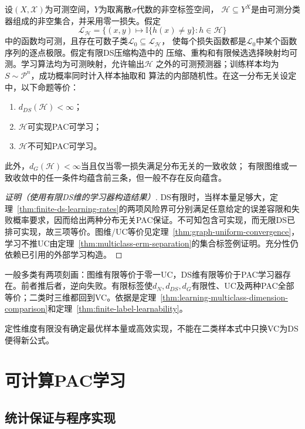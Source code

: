 \begin{theorem}[多分类学习基本定理]
\label{thm:ds-characterization}
设$(X,\mathcal X)$为可测空间，$Y$为取离散$\sigma$代数的非空标签空间，
$\mathcal H\subseteq Y^X$是由可测分类器组成的非空集合，并采用零一损失。假定
\[
 \mathcal L_{\mathcal H}
 =\{(x,y)\mapsto\mathbb I\{h(x)\neq y\}:h\in\mathcal H\}
\]
中的函数均可测，且存在可数子类$\mathcal L_0\subseteq\mathcal L_{\mathcal H}$，
使每个损失函数都是$\mathcal L_0$中某个函数序列的逐点极限。假定有限DS压缩构造中的
压缩、重构和有限候选选择映射均可测。学习算法均为可测映射，允许输出$\mathcal H$
之外的可测预测器；训练样本均为$S\sim\mathcal P^n$，成功概率同时计入样本抽取和
算法的内部随机性。在这一分布无关设定中，以下命题等价：
\begin{enumerate}
 \item $d_{DS}(\mathcal H)<\infty$；
 \item $\mathcal H$可实现PAC可学习；
 \item $\mathcal H$不可知PAC可学习。
\end{enumerate}
此外，$d_G(\mathcal H)<\infty$当且仅当零一损失满足分布无关的一致收敛；
有限图维或一致收敛中的任一条件均蕴含前三条，但一般不存在反向蕴含。
\end{theorem}

\begin{proof}[证明（使用有限DS维的学习器构造结果）]
DS有限时，当样本量足够大，定理~\ref{thm:finite-ds-learning-rates}的两项风险界可分别满足任意给定的误差容限和失败概率要求，因而给出两种分布无关PAC保证。不可知包含可实现，而无限DS已排可实现，故三项等价。图维/UC等价见定理~\ref{thm:graph-uniform-convergence}，学习不推UC由定理~\ref{thm:multiclass-erm-separation}的集合标签例证明。充分性仍依赖已引用的外部学习构造。
\end{proof}

一般多类有两项刻画：图维有限等价于零一UC，DS维有限等价于PAC学习器存在。前者推后者，逆向失败。有限标签使$d_N,d_{DS},d_G$有限性、UC及两种PAC全部等价；二类时三维都回到VC。依据是定理~\ref{thm:learning-multiclass-dimension-comparison}和定理~\ref{thm:finite-label-learnability}。

定性维度有限没有确定最优样本量或高效实现，不能在二类样本式中只换VC为DS便得新公式。

\section{可计算PAC学习}
\label{sec:computable-multiclass-learning}

\subsection{统计保证与程序实现}

